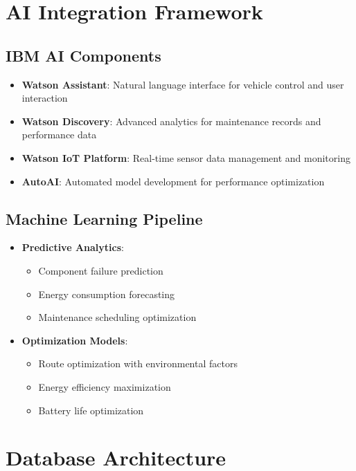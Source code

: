 \documentclass[12pt,a4paper]{article}
\begin{document}
\section{AI Integration Framework}
\subsection{IBM AI Components}
\begin{itemize}
    \item \textbf{Watson Assistant}: Natural language interface for vehicle control and user interaction
    \item \textbf{Watson Discovery}: Advanced analytics for maintenance records and performance data
    \item \textbf{Watson IoT Platform}: Real-time sensor data management and monitoring
    \item \textbf{AutoAI}: Automated model development for performance optimization
\end{itemize}

\subsection{Machine Learning Pipeline}
\begin{itemize}
    \item \textbf{Predictive Analytics}:
        \begin{itemize}
            \item Component failure prediction
            \item Energy consumption forecasting
            \item Maintenance scheduling optimization
        \end{itemize}
    \item \textbf{Optimization Models}:
        \begin{itemize}
            \item Route optimization with environmental factors
            \item Energy efficiency maximization
            \item Battery life optimization
        \end{itemize}
\end{itemize}

\section{Database Architecture}
\end{document}
